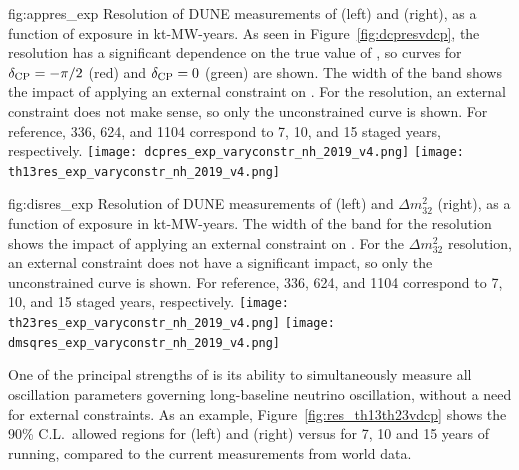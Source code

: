 \begin{dunefigure}
{fig:appres_exp}
{Resolution of DUNE measurements of \deltacp (left) and  (right), as a function of exposure in kt-MW-years. As seen in Figure~\ref{fig:dcpresvdcp}, the \deltacp resolution has a significant dependence on the true value of \deltacp, so curves for $\delta_{\rm CP}=-\pi/2$ (red) and $\delta_{\rm CP}=0$ (green) are shown. The width of the band shows the impact of applying an external constraint on . For the  resolution, an external constraint does not make sense, so only the unconstrained curve is shown.  
For reference, 336, 624, and \SI{1104}{\ktMWyr} correspond to 7, 10, and 15 staged years, respectively.
}
		\texttt{[image: dcpres\_exp\_varyconstr\_nh\_2019\_v4.png]} %
		\texttt{[image: th13res\_exp\_varyconstr\_nh\_2019\_v4.png]} 
\end{dunefigure}


\begin{dunefigure}
{fig:disres_exp}
{Resolution of DUNE measurements of  (left) and $\Delta m^{2}_{32}$ (right), as a function of exposure in kt-MW-years. The width of the band for the  resolution shows the impact of applying an external constraint on . For the $\Delta m^{2}_{32}$ resolution, an external constraint does not have a significant impact, so only the unconstrained curve is shown.
For reference, 336, 624, and \SI{1104}{\ktMWyr} correspond to 7, 10, and 15 staged years, respectively.
}
		\texttt{[image: th23res\_exp\_varyconstr\_nh\_2019\_v4.png]} %
		\texttt{[image: dmsqres\_exp\_varyconstr\_nh\_2019\_v4.png]} 
\end{dunefigure}


%
One of the principal strengths of  is its ability to simultaneously measure all oscillation parameters governing long-baseline neutrino oscillation, without a need for external constraints. As an example, Figure~\ref{fig:res_th13th23vdcp} shows the 90\% C.L.\ allowed regions for  (left) and  (right) versus \deltacp for 7, 10 and 15 years of running, 
compared to the current measurements from world data.



